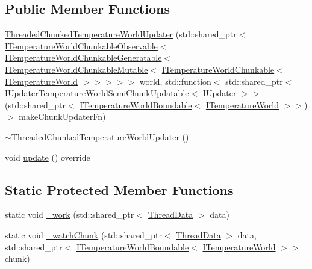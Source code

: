 \subsection*{Public Member Functions}
\begin{DoxyCompactItemize}
\item 
\hyperlink{class_threaded_chunked_temperature_world_updater_a507ac4498ed0537ecc5760948c44b69d}{Threaded\-Chunked\-Temperature\-World\-Updater} (std\-::shared\-\_\-ptr$<$ \hyperlink{class_i_temperature_world_chunkable_observable}{I\-Temperature\-World\-Chunkable\-Observable}$<$ \hyperlink{class_i_temperature_world_chunkable_generatable}{I\-Temperature\-World\-Chunkable\-Generatable}$<$ \hyperlink{class_i_temperature_world_chunkable_mutable}{I\-Temperature\-World\-Chunkable\-Mutable}$<$ \hyperlink{class_i_temperature_world_chunkable}{I\-Temperature\-World\-Chunkable}$<$ \hyperlink{class_i_temperature_world}{I\-Temperature\-World} $>$$>$$>$$>$$>$ world, std\-::function$<$ std\-::shared\-\_\-ptr$<$ \hyperlink{class_i_updater_temperature_world_semi_chunk_updatable}{I\-Updater\-Temperature\-World\-Semi\-Chunk\-Updatable}$<$ \hyperlink{class_i_updater}{I\-Updater} $>$$>$(std\-::shared\-\_\-ptr$<$ \hyperlink{class_i_temperature_world_boundable}{I\-Temperature\-World\-Boundable}$<$ \hyperlink{class_i_temperature_world}{I\-Temperature\-World} $>$$>$)$>$ make\-Chunk\-Updater\-Fn)
\item 
\hyperlink{class_threaded_chunked_temperature_world_updater_a43882f9d6af677633e51f9058d5fee16}{$\sim$\-Threaded\-Chunked\-Temperature\-World\-Updater} ()
\item 
void \hyperlink{class_threaded_chunked_temperature_world_updater_ad59106d88fbc531f52e974777a9ae34e}{update} () override
\end{DoxyCompactItemize}
\subsection*{Static Protected Member Functions}
\begin{DoxyCompactItemize}
\item 
static void \hyperlink{class_threaded_chunked_temperature_world_updater_ac3102a06273cb6767fd164ac9d89f0f3}{\-\_\-work} (std\-::shared\-\_\-ptr$<$ \hyperlink{struct_threaded_chunked_temperature_world_updater_1_1_thread_data}{Thread\-Data} $>$ data)
\item 
static void \hyperlink{class_threaded_chunked_temperature_world_updater_a955d07247e1edf94388fe775cee19cff}{\-\_\-watch\-Chunk} (std\-::shared\-\_\-ptr$<$ \hyperlink{struct_threaded_chunked_temperature_world_updater_1_1_thread_data}{Thread\-Data} $>$ data, std\-::shared\-\_\-ptr$<$ \hyperlink{class_i_temperature_world_boundable}{I\-Temperature\-World\-Boundable}$<$ \hyperlink{class_i_temperature_world}{I\-Temperature\-World} $>$$>$ chunk)
\end{DoxyCompactItemize}
